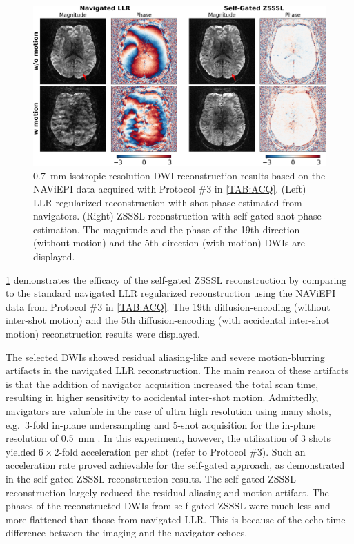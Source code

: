 \documentclass[journal,twoside,web]{ieeecolor}
\begin{document}
	\begin{figure}
		\centering
		\includegraphics[width=\textwidth]{../figures/fig5.png}
		\caption{\SI{0.7}{\milli\meter} isotropic resolution DWI reconstruction results
			based on the NAViEPI data acquired with Protocol \#3 in \cref{TAB:ACQ}.
			(Left) LLR regularized reconstruction with shot phase estimated from navigators.
			(Right) ZSSSL reconstruction with self-gated shot phase estimation.
			The magnitude and the phase
			of the 19th-direction (without motion) and the 5th-direction (with motion)
			DWIs are displayed.}
		\label{FIG:MOTION_RETRO_AXIAL}
	\end{figure}

	\cref{FIG:MOTION_RETRO_AXIAL} demonstrates
	the efficacy of the self-gated ZSSSL reconstruction
	by comparing to the standard navigated LLR regularized reconstruction
	using the NAViEPI data from Protocol \#3 in \cref{TAB:ACQ}.
	The 19th diffusion-encoding (without inter-shot motion)
	and the 5th diffusion-encoding (with accidental inter-shot motion)
	reconstruction results were displayed.

	The selected DWIs showed residual aliasing-like and severe motion-blurring artifacts
	in the navigated LLR reconstruction.
	The main reason of these artifacts is that the addition of navigator acquisition
	increased the total scan time,
	resulting in higher sensitivity to accidental inter-shot motion.
	Admittedly, navigators are valuable in the case of ultra high resolution
	using many shots, e.g.~3-fold in-plane undersampling and 5-shot acquisition
	for the in-plane resolution of 0.5~mm \cite{tan_2024_naviepi}.
	In this experiment, however, the utilization of 3 shots yielded
	$6 \times 2$-fold acceleration per shot (refer to Protocol \#3).
	Such an acceleration rate proved achievable for the self-gated approach,
	as demonstrated in the self-gated ZSSSL reconstruction results.
	The self-gated ZSSSL reconstruction largely reduced the residual aliasing
	and motion artifact. The phases of the reconstructed DWIs from self-gated ZSSSL
	were much less and more flattened than those from navigated LLR.
	This is because of the echo time difference between the imaging and the navigator echoes.
\end{document}
